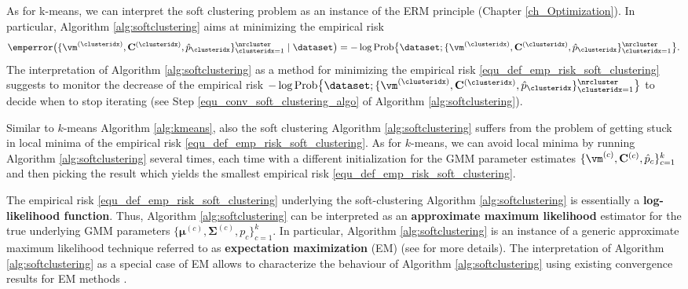 \documentclass[12pt]{report}
\begin{document}
As for k-means, we can interpret the soft clustering problem 
as an instance of the ERM principle (Chapter \ref{ch_Optimization}). 
In particular, Algorithm \ref{alg:softclustering} aims at minimizing the 
empirical risk 
\begin{equation} 
\label{equ_def_emp_risk_soft_clustering}
\emperror \big( \{ \vm^{(\clusteridx)}, \mathbf{C}^{(\clusteridx)}, \hat{p}_{\clusteridx} \}_{\clusteridx=1}^{\nrcluster} \mid \dataset \big)=
 - \log {\rm Prob} \big\{\dataset; \{ \vm^{(\clusteridx)}, \mathbf{C}^{(\clusteridx)}, \hat{p}_{\clusteridx} \}_{\clusteridx=1}^{\nrcluster}\big\}. 
\end{equation} 
The interpretation of Algorithm \ref{alg:softclustering} as a 
method for minimizing the empirical risk \eqref{equ_def_emp_risk_soft_clustering} 
suggests to monitor the decrease of the empirical risk 
$ - \log {\rm Prob} \big\{\dataset; \{ \vm^{(\clusteridx)}, \mathbf{C}^{(\clusteridx)}, \hat{p}_{\clusteridx} \}_{\clusteridx=1}^{\nrcluster}\big\}$ 
to decide when to stop iterating (see Step \ref{equ_conv_soft_clustering_algo} 
of Algorithm \ref{alg:softclustering}). %

Similar to $k$-means Algorithm \ref{alg:kmeans}, also the soft clustering 
Algorithm \ref{alg:softclustering} suffers from the problem of getting stuck 
in local minima of the empirical risk \eqref{equ_def_emp_risk_soft_clustering}. 
As for $k$-means, we can avoid local minima by running Algorithm \ref{alg:softclustering} 
several times, each time with a different initialization for the GMM parameter 
estimates $ \{ \vm^{(c)}, \mathbf{C}^{(c)}, \hat{p}_{c} \}_{c=1}^{k}$ and then 
picking the result which yields the smallest empirical risk \eqref{equ_def_emp_risk_soft_clustering}.  

The empirical risk \eqref{equ_def_emp_risk_soft_clustering} underlying the 
soft-clustering Algorithm \ref{alg:softclustering} is essentially a {\bf log-likelihood function}. 
Thus, Algorithm \ref{alg:softclustering} can be interpreted as an {\bf approximate maximum 
likelihood} estimator for the true underlying GMM parameters $\{{\bm \mu}^{(c)},{\bm \Sigma}^{(c)},p_{c}\}_{c=1}^{k}$. 
In particular, Algorithm \ref{alg:softclustering} is an instance of a generic 
approximate maximum likelihood technique referred to as {\bf expectation maximization} 
(EM) (see \cite[Chap. 8.5]{hastie01statisticallearning} for more details). 
The interpretation of Algorithm \ref{alg:softclustering} as a special case of 
EM allows to characterize the behaviour of Algorithm \ref{alg:softclustering} 
using existing convergence results for EM methods \cite{XuJordan1996}. 
%
\end{document}
